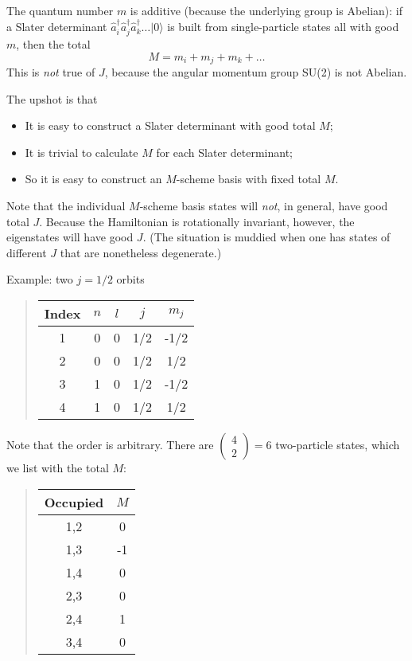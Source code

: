 The quantum number $m$ is additive (because the underlying group is Abelian): 
if a Slater determinant $\hat{a}_i^\dagger \hat{a}^\dagger_j \hat{a}^\dagger_k \ldots | 0 \rangle$ 
is built from single-particle states all with good $m$, then the total 
\[
M = m_i + m_j + m_k + \ldots
\]
This is \emph{not} true of $J$, because the angular momentum group SU(2) is not Abelian.

The upshot is that 
\begin{itemize}
\item It is easy to construct a Slater determinant with good total $M$;

\item It is trivial to calculate $M$ for each Slater determinant;

\item So it is easy to construct an $M$-scheme basis with fixed total $M$.
\end{itemize}

\noindent
Note that the individual $M$-scheme basis states will \emph{not}, in general, 
have good total $J$. 
Because the Hamiltonian is rotationally invariant, however, the eigenstates will 
have good $J$. (The situation is muddied when one has states of different $J$ that are 
nonetheless degenerate.) 




Example: two $j=1/2$ orbits


\begin{quote}
\begin{tabular}{ccccc}
\hline
\multicolumn{1}{c}{ Index } & \multicolumn{1}{c}{ $n$ } & \multicolumn{1}{c}{ $l$ } & \multicolumn{1}{c}{ $j$ } & \multicolumn{1}{c}{ $m_j$ } \\
\hline
1     & 0   & 0   & 1/2 & -1/2  \\
2     & 0   & 0   & 1/2 & 1/2   \\
3     & 1   & 0   & 1/2 & -1/2  \\
4     & 1   & 0   & 1/2 & 1/2   \\
\hline
\end{tabular}
\end{quote}

\noindent
Note that the order is arbitrary.
There are $\left ( \begin{array}{c} 4 \\ 2 \end{array} \right) = 6$ two-particle states, 
which we list with the total $M$:


\begin{quote}
\begin{tabular}{cc}
\hline
\multicolumn{1}{c}{ Occupied } & \multicolumn{1}{c}{ $M$ } \\
\hline
1,2      & 0   \\
1,3      & -1  \\
1,4      & 0   \\
2,3      & 0   \\
2,4      & 1   \\
3,4      & 0   \\
\hline
\end{tabular}
\end{quote}

